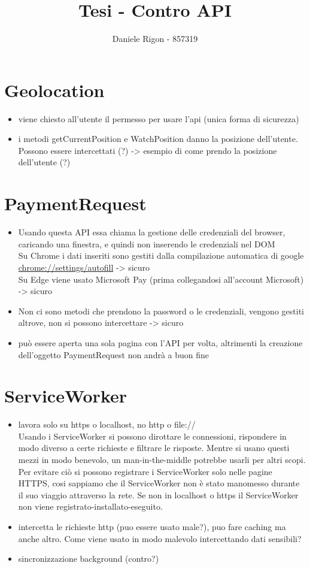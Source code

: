 \documentclass[italian]{article}
\author{
	Daniele Rigon - 857319 \\
}
\begin{document}
\title{Tesi - Contro API}
\maketitle

\tableofcontents
\pagebreak
\section{Geolocation}
\begin{itemize}
\item viene chiesto all'utente il permesso per usare l'api (unica forma di sicurezza)
\item i metodi getCurrentPosition e WatchPosition danno la posizione dell'utente. Possono essere intercettati (?) -> esempio di come prendo la posizione dell'utente (?)
\end{itemize}

\section{PaymentRequest}
\begin{itemize}
\item Usando questa API essa chiama la gestione delle credenziali del browser, caricando una finestra, e quindi non inserendo le credenziali nel DOM
\\
Su Chrome i dati inseriti sono gestiti dalla compilazione automatica di google \url{chrome://settings/autofill} -> sicuro
\\
Su Edge viene usato Microsoft Pay (prima collegandosi all'account Microsoft) -> sicuro 
\item Non ci sono metodi che prendono la password o le credenziali, vengono gestiti altrove, non si possono intercettare -> sicuro
\item può essere aperta una sola pagina con l'API per volta, altrimenti la creazione dell'oggetto PaymentRequest non andrà a buon fine 
\end{itemize}

\section{ServiceWorker}
\begin{itemize}
\item lavora solo su https o localhost, no http o file://
\\
Usando i ServiceWorker si possono dirottare le connessioni, rispondere in modo diverso a certe richieste e filtrare le risposte. Mentre  si usano questi mezzi in modo benevolo, un man-in-the-middle potrebbe usarli per altri scopi. Per evitare ciò si possono registrare i ServiceWorker solo nelle pagine HTTPS, cosi sappiamo che il ServiceWorker non è stato manomesso durante il suo viaggio attraverso la rete. Se non in localhost o https il ServiceWorker non viene registrato-installato-eseguito.
\item intercetta le richieste http (puo essere usato male?), puo fare caching ma anche altro. Come viene usato in modo malevolo intercettando dati sensibili?
\item sincronizzazione background (contro?)
\end{itemize}
\end{document}

